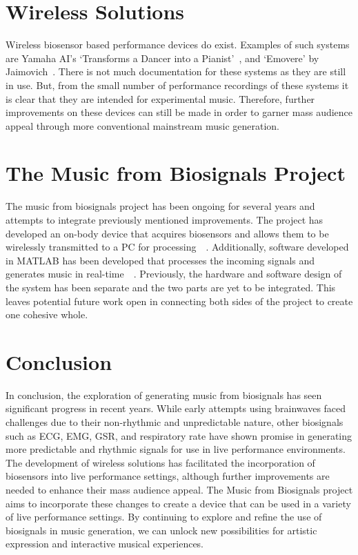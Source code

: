 \section{Wireless Solutions}
Wireless biosensor based performance devices do exist.
Examples of such systems are Yamaha AI's `Transforms a Dancer into a Pianist'~\cite{Yamaha:2018}, and `Emovere' by Jaimovich~\cite{Jaimovich:2016}.
There is not much documentation for these systems as they are still in use.
But, from the small number of performance recordings of these systems it is clear that they are intended for experimental music.
Therefore, further improvements on these devices can still be made in order to garner mass audience appeal through more conventional mainstream music generation.

\section{The Music from Biosignals Project}
The music from biosignals project has been ongoing for several years and attempts to integrate previously mentioned improvements.
The project has developed an on-body device that acquires biosensors and allows them to be wirelessly transmitted to a PC for processing~\cite{Pierro:2019}~\cite{Tran:2022}.
Additionally, software developed in MATLAB has been developed that processes the incoming signals and generates music in real-time~\cite{Chen:2016}~\cite{Nicholls:2019}.
Previously, the hardware and software design of the system has been separate and the two parts are yet to be integrated.
This leaves potential future work open in connecting both sides of the project to create one cohesive whole.

\section{Conclusion}
In conclusion, the exploration of generating music from biosignals has seen significant progress in recent years.
While early attempts using brainwaves faced challenges due to their non-rhythmic and unpredictable nature,
other biosignals such as ECG, EMG, GSR, and respiratory rate have shown promise in generating more predictable and rhythmic signals for use in live performance environments.
The development of wireless solutions has facilitated the incorporation of biosensors into live performance settings,
although further improvements are needed to enhance their mass audience appeal.
The Music from Biosignals project aims to incorporate these changes to create a device that can be used in a variety of live performance settings.
By continuing to explore and refine the use of biosignals in music generation, we can unlock new possibilities for artistic expression and interactive musical experiences.

\nocite{*}
\printbibliography{}


